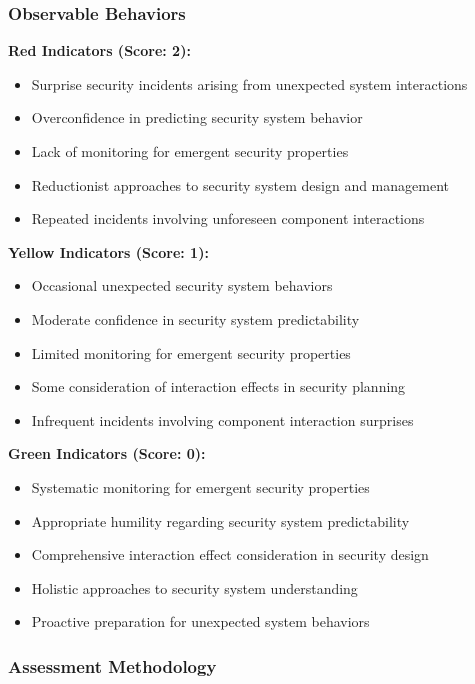 \documentclass[11pt,a4paper]{article}
\begin{document}
\subsubsection{Observable Behaviors}

\textbf{Red Indicators (Score: 2):}
\begin{itemize}
\item Surprise security incidents arising from unexpected system interactions
\item Overconfidence in predicting security system behavior
\item Lack of monitoring for emergent security properties
\item Reductionist approaches to security system design and management
\item Repeated incidents involving unforeseen component interactions
\end{itemize}

\textbf{Yellow Indicators (Score: 1):}
\begin{itemize}
\item Occasional unexpected security system behaviors
\item Moderate confidence in security system predictability
\item Limited monitoring for emergent security properties
\item Some consideration of interaction effects in security planning
\item Infrequent incidents involving component interaction surprises
\end{itemize}

\textbf{Green Indicators (Score: 0):}
\begin{itemize}
\item Systematic monitoring for emergent security properties
\item Appropriate humility regarding security system predictability
\item Comprehensive interaction effect consideration in security design
\item Holistic approaches to security system understanding
\item Proactive preparation for unexpected system behaviors
\end{itemize}

\subsubsection{Assessment Methodology}
\end{document}
